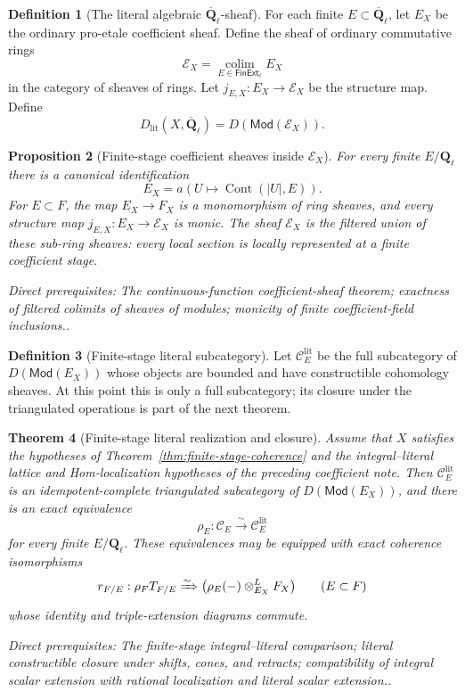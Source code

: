 \documentclass[10pt]{article}
\newtheorem{theorem}{Theorem}[section]
\newtheorem{proposition}[theorem]{Proposition}
\theoremstyle{definition}
\newtheorem{definition}[theorem]{Definition}
\newcommand{\Ql}{\mathbf Q_\ell}
\newcommand{\Qlb}{\overline{\mathbf Q}_\ell}
\newcommand{\depends}[1]{\par\smallskip\noindent\textit{Direct prerequisites:} #1.}
\begin{document}
\begin{definition}[The literal algebraic $\Qlb$-sheaf]
\label{def:literal-qbar}
For each finite $E\subset\Qlb$, let $E_X$ be the ordinary pro-etale
coefficient sheaf.  Define the sheaf of ordinary commutative rings
\[
 \mathcal E_X=\operatorname*{colim}_{E\in\mathsf{FinExt}_\ell}E_X
\]
in the category of sheaves of rings.  Let
$j_{E,X}:E_X\to\mathcal E_X$ be the structure map.  Define
\[
D_{\mathrm{lit}}(X,\Qlb)=
 D(\mathsf{Mod}(\mathcal E_X)).
\]
\end{definition}

\begin{proposition}[Finite-stage coefficient sheaves inside $\mathcal E_X$]
\label{prop:literal-coefficient-stages}
For every finite $E/\Ql$ there is a canonical identification
\[
 E_X=a\!\left(U\longmapsto\operatorname{Cont}(|U|,E)\right).
\]
For $E\subset F$, the map $E_X\to F_X$ is a monomorphism of ring sheaves,
and every structure map $j_{E,X}:E_X\to\mathcal E_X$ is monic.  The sheaf
$\mathcal E_X$ is the filtered union of these sub-ring sheaves: every local
section is locally represented at a finite coefficient stage.
\depends{The continuous-function coefficient-sheaf theorem; exactness of
filtered colimits of sheaves of modules; monicity of finite coefficient-field
inclusions.}
\end{proposition}

\begin{definition}[Finite-stage literal subcategory]
\label{def:literal-finite-stage}
Let $\mathcal C_E^{\mathrm{lit}}$ be the full subcategory of
$D(\mathsf{Mod}(E_X))$ whose objects are bounded and have constructible
cohomology sheaves.  At this point this is only a full subcategory; its
closure under the triangulated operations is part of the next theorem.
\end{definition}

\begin{theorem}[Finite-stage literal realization and closure]
\label{thm:literal-realization}
Assume that $X$ satisfies the hypotheses of
Theorem~\ref{thm:finite-stage-coherence} and the integral--literal lattice
and Hom-localization hypotheses of the preceding coefficient note.  Then
$\mathcal C_E^{\mathrm{lit}}$ is an idempotent-complete triangulated
subcategory of $D(\mathsf{Mod}(E_X))$, and there is an exact equivalence
\[
 \rho_E:\mathcal C_E\xrightarrow{\sim}\mathcal C_E^{\mathrm{lit}}
\]
for every finite $E/\Ql$.  These equivalences may be equipped with exact
coherence isomorphisms
\[
 r_{F/E}:\rho_FT_{F/E}\xRightarrow{\sim}
 \bigl(\rho_E(-)\otimes^L_{E_X}F_X\bigr)
 \qquad(E\subset F)
\]
whose identity and triple-extension diagrams commute.
\depends{The finite-stage integral--literal comparison; literal
constructible closure under shifts, cones, and retracts; compatibility of
integral scalar extension with rational localization and literal scalar
extension.}
\end{theorem}
\end{document}
